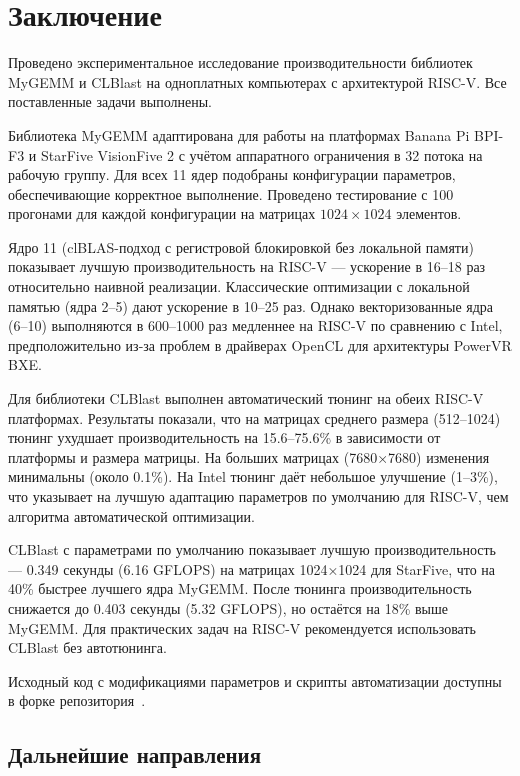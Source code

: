 
\section*{Заключение}

Проведено экспериментальное исследование производительности библиотек MyGEMM и CLBlast на одноплатных компьютерах с архитектурой RISC-V. Все поставленные задачи выполнены.

Библиотека MyGEMM адаптирована для работы на платформах Banana Pi BPI-F3 и StarFive VisionFive 2 с учётом аппаратного ограничения в 32 потока на рабочую группу. Для всех 11 ядер подобраны конфигурации параметров, обеспечивающие корректное выполнение. Проведено тестирование с 100 прогонами для каждой конфигурации на матрицах $1024 \times 1024$ элементов.

Ядро 11 (clBLAS-подход с регистровой блокировкой без локальной памяти) показывает лучшую производительность на RISC-V --- ускорение в 16--18 раз относительно наивной реализации. Классические оптимизации с локальной памятью (ядра 2--5) дают ускорение в 10--25 раз. Однако векторизованные ядра (6--10) выполняются в 600--1000 раз медленнее на RISC-V по сравнению с Intel, предположительно из-за проблем в драйверах OpenCL для архитектуры PowerVR BXE.

Для библиотеки CLBlast выполнен автоматический тюнинг на обеих RISC-V платформах. Результаты показали, что на матрицах среднего размера (512--1024) тюнинг ухудшает производительность на 15.6--75.6\% в зависимости от платформы и размера матрицы. На больших матрицах (7680×7680) изменения минимальны (около 0.1\%). На Intel тюнинг даёт небольшое улучшение (1--3\%), что указывает на лучшую адаптацию параметров по умолчанию для RISC-V, чем алгоритма автоматической оптимизации.

CLBlast с параметрами по умолчанию показывает лучшую производительность --- 0.349 секунды (6.16 GFLOPS) на матрицах 1024×1024 для StarFive, что на 40\% быстрее лучшего ядра MyGEMM. После тюнинга производительность снижается до 0.403 секунды (5.32 GFLOPS), но остаётся на 18\% выше MyGEMM. Для практических задач на RISC-V рекомендуется использовать CLBlast без автотюнинга.

Исходный код с модификациями параметров и скрипты автоматизации доступны в форке репозитория~\cite{mygemm_repo_test}.

\subsection*{Дальнейшие направления}

